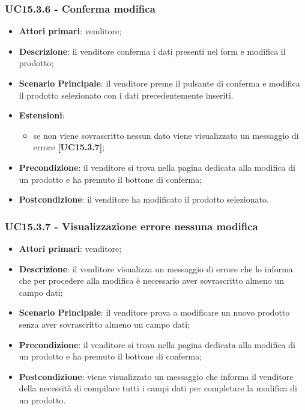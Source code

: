 \subsubsection{UC15.3.6 - Conferma modifica}
\begin{itemize}
\item \textbf{Attori primari}: venditore;
\item \textbf{Descrizione}: il venditore conferma i dati presenti nel form e modifica il prodotto;
\item \textbf{Scenario Principale}: il venditore preme il pulsante di conferma e modifica il prodotto selezionato con i dati precedentemente inseriti.
\item \textbf{Estensioni}: 
\begin{itemize}
	\item se non viene sovrascritto nessun dato viene visualizzato un messaggio di errore \textbf{[UC15.3.7]};
\end{itemize} 
\item \textbf{Precondizione}: il venditore si trova nella pagina dedicata alla modifica di un prodotto e ha premuto il bottone di conferma;
\item \textbf{Postcondizione}: il venditore ha modificato il prodotto selezionato.
\end{itemize}

\subsubsection{UC15.3.7 - Visualizzazione errore nessuna modifica}
\begin{itemize}
\item \textbf{Attori primari}: venditore;
\item \textbf{Descrizione}: il venditore visualizza un messaggio di errore che lo informa che per procedere alla modifica è necessario aver sovrascritto almeno un campo dati;
\item \textbf{Scenario Principale}: il venditore prova a modificare un nuovo prodotto senza aver sovrascritto almeno un campo dati;
\item \textbf{Precondizione}: il venditore si trova nella pagina dedicata alla modifica di un prodotto e ha premuto il bottone di conferma;
\item \textbf{Postcondizione}: viene visualizzato un messaggio che informa il venditore della necessità di compilare tutti i campi dati per completare la modifica di un prodotto.
\end{itemize}

